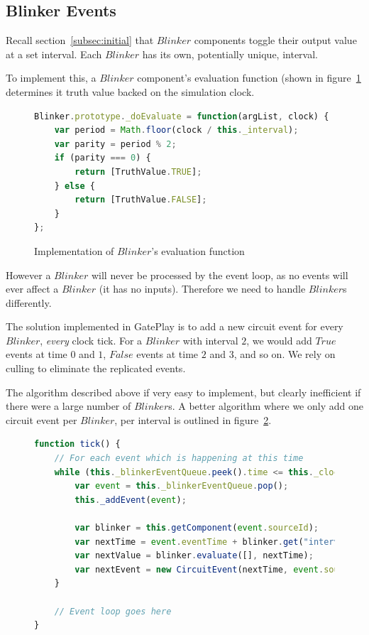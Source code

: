 \subsection{Blinker Events}
Recall section~\ref{subsec:initial} that $Blinker$ components toggle their output value at a set interval. Each $Blinker$ has its own, potentially unique, interval.

To implement this, a $Blinker$ component's evaluation function (shown in figure~\ref{fig:blinkereval} determines it truth value backed on the simulation clock.

\begin{figure}
\begin{lstlisting}[language=JavaScript]
Blinker.prototype._doEvaluate = function(argList, clock) {
    var period = Math.floor(clock / this._interval);
    var parity = period % 2;
    if (parity === 0) {
        return [TruthValue.TRUE];
    } else {
        return [TruthValue.FALSE];
    }
};
\end{lstlisting}
\caption{Implementation of $Blinker$'s evaluation function}
\label{fig:blinkereval}
\end{figure}

However a $Blinker$ will never be processed by the event loop, as no events will ever affect a $Blinker$ (it has no inputs). Therefore we need to handle $Blinker$s differently.

The solution implemented in GatePlay is to add a new circuit event for every $Blinker$, \textit{every} clock tick. For a $Blinker$ with interval $2$, we would add $True$ events at time $0$ and $1$, $False$ events at time $2$ and $3$, and so on. We rely on culling to eliminate the replicated events.

The algorithm described above if very easy to implement, but clearly inefficient if there were a large number of $Blinker$s. A better algorithm where we only add one circuit event per $Blinker$, per interval is outlined in figure~\ref{fig:blinkerqueue}. 

\begin{figure}
\begin{lstlisting}[language=JavaScript]
function tick() {
	// For each event which is happening at this time
	while (this._blinkerEventQueue.peek().time <= this._clock) {
		var event = this._blinkerEventQueue.pop();
		this._addEvent(event);
		
		var blinker = this.getComponent(event.sourceId);
		var nextTime = event.eventTime + blinker.get("interval");
		var nextValue = blinker.evaluate([], nextTime);
		var nextEvent = new CircuitEvent(nextTime, event.sourceId, event.sourcePort, nextValue);
	}
	
	// Event loop goes here
}
\end{lstlisting}
\caption{}
\label{fig:blinkerqueue}
\end{figure}

